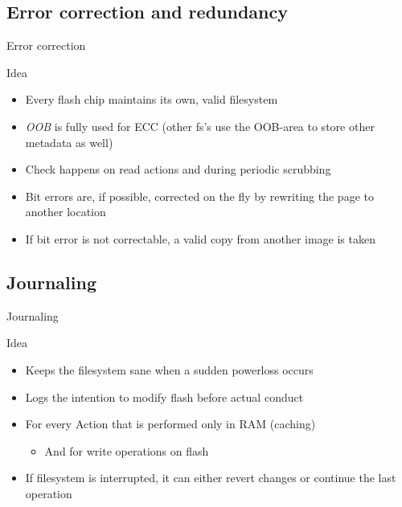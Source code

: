 \documentclass[
	,footlinenumber
	,navline=true
	,footlineauthor
	,ngerman
	]{beamer}
\begin{document}
\subsection{Error correction and redundancy}
\begin{frame}{Error correction}
	\begin{block}{Idea}
		\begin{itemize}
			\item Every flash chip maintains its own, valid filesystem
			\item \textit{OOB} is fully used for ECC (other fs's use the OOB-area to store other metadata as well)
			\item Check happens on read actions and during periodic scrubbing 
			\item Bit errors are, if possible, corrected on the fly by rewriting the page to another location
			\item If bit error is not correctable, a valid copy from another image is taken 
		\end{itemize}
	\end{block}
\end{frame}

\subsection{Journaling}
\begin{frame}{Journaling}
	\begin{block}{Idea}
		\begin{itemize}
			\item Keeps the filesystem sane when a sudden powerloss occurs
			\item Logs the intention to modify flash before actual conduct
			\item For every Action that is performed only in RAM (caching)
			\begin{itemize}
				\item And for write operations on flash
			\end{itemize}
			\item If filesystem is interrupted, it can either revert changes or continue the last operation
		\end{itemize}
	\end{block}
\end{frame}
\end{document}
